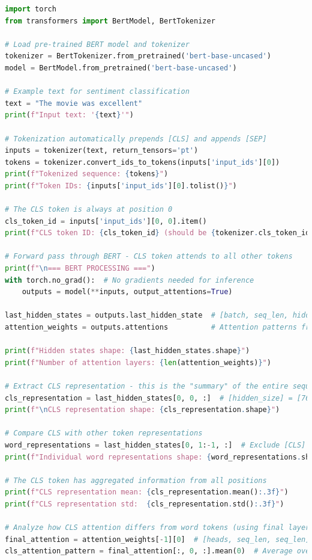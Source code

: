 \begin{lstlisting}[language=Python, caption={CLS token processing and sequence-level aggregation}]
import torch
from transformers import BertModel, BertTokenizer

# Load pre-trained BERT model and tokenizer
tokenizer = BertTokenizer.from_pretrained('bert-base-uncased')
model = BertModel.from_pretrained('bert-base-uncased')

# Example text for sentiment classification
text = "The movie was excellent"
print(f"Input text: '{text}'")

# Tokenization automatically prepends [CLS] and appends [SEP]
inputs = tokenizer(text, return_tensors='pt')
tokens = tokenizer.convert_ids_to_tokens(inputs['input_ids'][0])
print(f"Tokenized sequence: {tokens}")
print(f"Token IDs: {inputs['input_ids'][0].tolist()}")

# The CLS token is always at position 0
cls_token_id = inputs['input_ids'][0, 0].item()
print(f"CLS token ID: {cls_token_id} (should be {tokenizer.cls_token_id})")

# Forward pass through BERT - CLS token attends to all other tokens
print(f"\n=== BERT PROCESSING ===")
with torch.no_grad():  # No gradients needed for inference
    outputs = model(**inputs, output_attentions=True)

last_hidden_states = outputs.last_hidden_state  # [batch, seq_len, hidden_size]
attention_weights = outputs.attentions          # Attention patterns from all layers

print(f"Hidden states shape: {last_hidden_states.shape}")
print(f"Number of attention layers: {len(attention_weights)}")

# Extract CLS representation - this is the "summary" of the entire sequence
cls_representation = last_hidden_states[0, 0, :]  # [hidden_size] = [768]
print(f"\nCLS representation shape: {cls_representation.shape}")

# Compare CLS with other token representations
word_representations = last_hidden_states[0, 1:-1, :]  # Exclude [CLS] and [SEP]
print(f"Individual word representations shape: {word_representations.shape}")

# The CLS token has aggregated information from all positions
print(f"CLS representation mean: {cls_representation.mean():.3f}")
print(f"CLS representation std:  {cls_representation.std():.3f}")

# Analyze how CLS attention differs from word tokens (using final layer)
final_attention = attention_weights[-1][0]  # [heads, seq_len, seq_len]
cls_attention_pattern = final_attention[:, 0, :].mean(0)  # Average over heads


\end{lstlisting}
